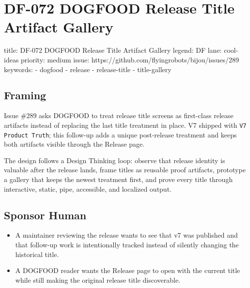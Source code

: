 \chapter{DF-072 DOGFOOD Release Title Artifact Gallery}\label{record-112}

\smallskip

\begin{RecordMeta}
title: DF-072 DOGFOOD Release Title Artifact Gallery
legend: DF
lane: cool-ideas
priority: medium
issue: https://github.com/flyingrobots/bijou/issues/289
keywords:
  - dogfood
  - release
  - release-title
  - title-gallery

\end{RecordMeta}

\section{Framing}\label{record-112-framing}

Issue \#289 asks DOGFOOD to treat release title screens as first-class release artifacts instead of replacing the last title treatment in place. V7 shipped with \texttt{V\allowbreak{}7\allowbreak{} \allowbreak{}P\allowbreak{}r\allowbreak{}o\allowbreak{}d\allowbreak{}u\allowbreak{}c\allowbreak{}t\allowbreak{} \allowbreak{}T\allowbreak{}r\allowbreak{}u\allowbreak{}t\allowbreak{}h}; this follow-up adds a unique post-release treatment and keeps both artifacts visible through the Release page.

The design follows a Design Thinking loop: observe that release identity is valuable after the release lands, frame titles as reusable proof artifacts, prototype a gallery that keeps the newest treatment first, and prove every title through interactive, static, pipe, accessible, and localized output.

\section{Sponsor Human}\label{record-112-sponsor-human}

\begin{itemize}
\tightlist
\item
  A maintainer reviewing the release wants to see that v7 was published and that follow-up work is intentionally tracked instead of silently changing the historical title.
\item
  A DOGFOOD reader wants the Release page to open with the current title while still making the original release title discoverable.
\end{itemize}

